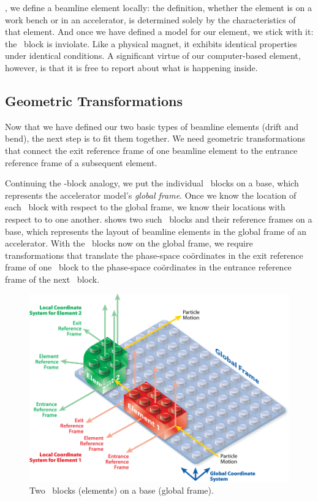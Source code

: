, we define a beamline element locally:
the definition, whether the element is on a work bench or in an
accelerator, is determined solely by the characteristics of that
element. And once we have defined a model for our element, we stick
with it: the \LEGO\ block is inviolate. Like a physical magnet, it
exhibits identical properties under identical conditions.
A significant virtue of our computer-based element, however,
is that it is free to report about what is happening inside.


\subsection{Geometric Transformations}

%
Now that we have defined our two basic types of beamline elements
(drift and bend), the next step is to fit them together. We need
geometric transformations that connect the exit reference frame of
one beamline element to the entrance reference frame of a subsequent
element.

%
Continuing the \LEGO-block analogy, we put the individual
\LEGO\ blocks on a base, which represents the accelerator model's
\emph{global frame}. Once we know the location of each
\LEGO\ block with respect to the global frame, we know their
locations with respect to to one another.
 shows two such \LEGO\ blocks and
their reference frames on a base, which represents the layout of
beamline elements in the global frame of an accelerator. With the
\LEGO\ blocks now on the global frame, we require transformations
that translate the phase-space co\"ordinates in the exit reference
frame of one \LEGO\ block to the phase-space co\"ordinates in the
entrance reference frame of the next \LEGO\ block.
\begin{figure}[ht]\forcerectofloat
  \centering
  \includegraphics[width=.9\textwidth]{illustrations/LEGO-concept-2}
  \caption{Two \LEGO\ blocks (elements) on a base (global frame).}
  \label{fig:LEGO.blocks.base}
\end{figure}

